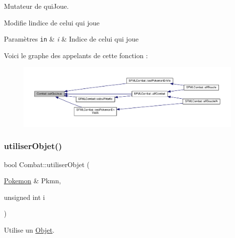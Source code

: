 Mutateur de qui\+Joue. 

Modifie l\textquotesingle{}indice de celui qui joue 
\begin{DoxyParams}[1]{Paramètres}
\mbox{\tt in}  & {\em i} & Indice de celui qui joue \\
\hline
\end{DoxyParams}
Voici le graphe des appelants de cette fonction \+:\nopagebreak
\begin{figure}[H]
\begin{center}
\leavevmode
\includegraphics[width=350pt]{class_combat_a292caf86cb2c8ecbf9ecd055e6a028c0_icgraph}
\end{center}
\end{figure}
\mbox{\label{class_combat_a3ab678df151ed9210806f89d1aeb47ab}} 
\subsubsection{\texorpdfstring{utiliser\+Objet()}{utiliserObjet()}}
{\footnotesize\ttfamily bool Combat\+::utiliser\+Objet (\begin{DoxyParamCaption}\item[{\hyperlink{class_pokemon}{Pokemon} \&}]{Pkmn,  }\item[{unsigned int}]{i }\end{DoxyParamCaption})}



Utilise un \hyperlink{class_objet}{Objet}. 


